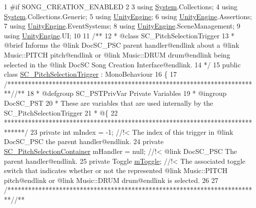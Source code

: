 \begin{DoxyCodeInclude}
1 \textcolor{preprocessor}{#if SONG\_CREATION\_ENABLED}
2 
3 \textcolor{keyword}{using} \hyperlink{namespace_system}{System}.Collections;
4 \textcolor{keyword}{using} \hyperlink{namespace_system}{System}.Collections.Generic;
5 \textcolor{keyword}{using} \hyperlink{namespace_unity_engine}{UnityEngine};
6 \textcolor{keyword}{using} \hyperlink{namespace_unity_engine}{UnityEngine}.Assertions;
7 \textcolor{keyword}{using} \hyperlink{namespace_unity_engine}{UnityEngine}.EventSystems;
8 \textcolor{keyword}{using} \hyperlink{namespace_unity_engine}{UnityEngine}.SceneManagement;
9 \textcolor{keyword}{using} \hyperlink{namespace_unity_engine}{UnityEngine}.UI;
10 \textcolor{comment}{}
11 \textcolor{comment}{/**}
12 \textcolor{comment}{ * @class SC\_PitchSelectionTrigger}
13 \textcolor{comment}{ * @brief Informs the @link DocSC\_PSC parent handler@endlink about a @link Music::PITCH pitch@endlink or
       @link Music::DRUM drum@endlink being selected in the @link DocSC Song Creation Interface@endlink.}
14 \textcolor{comment}{*/}
15 \textcolor{keyword}{public} \textcolor{keyword}{class }\hyperlink{class_s_c___pitch_selection_trigger}{SC\_PitchSelectionTrigger} : MonoBehaviour
16 \{
17     \textcolor{comment}{/*************************************************************************/}\textcolor{comment}{/** }
18 \textcolor{comment}{    * @defgroup SC\_PSTPrivVar Private Variables}
19 \textcolor{comment}{    * @ingroup DocSC\_PST}
20 \textcolor{comment}{    * These are variables that are used internally by the SC\_PitchSelectionTrigger}
21 \textcolor{comment}{    * @\{}
22 \textcolor{comment}{    ******************************************************************************/}
23     \textcolor{keyword}{private} \textcolor{keywordtype}{int} mIndex = -1; \textcolor{comment}{//!< The index of this trigger in @link DocSC\_PSC the parent handler@endlink.}
24 \textcolor{comment}{}    \textcolor{keyword}{private} \hyperlink{class_s_c___pitch_selection_container}{SC\_PitchSelectionContainer} mHandler = null; \textcolor{comment}{//!< @link DocSC\_PSC The
       parent handler@endlink.}
25 \textcolor{comment}{}    \textcolor{keyword}{private} Toggle \hyperlink{group___s_c___p_s_t_priv_var_ga1ecd33f50c82f6ffda81850438907a31}{mToggle}; \textcolor{comment}{//!< The associated toggle switch that indicates whether or not the
       represented @link Music::PITCH pitch@endlink or @link Music::DRUM drum@endlink is selected.}
26 \textcolor{comment}{}
27     \textcolor{comment}{/*************************************************************************/}\textcolor{comment}{/** }

\end{DoxyCodeInclude}
